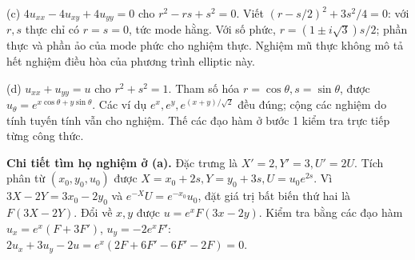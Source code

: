 \documentclass[10pt,a4paper]{article}
\begin{document}
(c) $4u_{xx}-4u_{xy}+4u_{yy}=0$ cho $r^2-rs+s^2=0$. Viết $(r-s/2)^2+3s^2/4=0$: với $r,s$ thực chỉ có $r=s=0$, tức mode hằng. Với số phức, $r=(1\pm i\sqrt3)s/2$; phần thực và phần ảo của mode phức cho nghiệm thực. Nghiệm mũ thực không mô tả hết nghiệm điều hòa của phương trình elliptic này.

(d) $u_{xx}+u_{yy}=u$ cho $r^2+s^2=1$. Tham số hóa $r=\cos\theta,s=\sin\theta$, được $u_\theta=e^{x\cos\theta+y\sin\theta}$. Các ví dụ $e^x,e^y,e^{(x+y)/\sqrt2}$ đều đúng; cộng các nghiệm do tính tuyến tính vẫn cho nghiệm. Thế các đạo hàm ở bước 1 kiểm tra trực tiếp từng công thức.

\textbf{Chi tiết tìm họ nghiệm ở (a).} Đặc trưng là $X'=2,Y'=3,U'=2U$. Tích phân từ $(x_0,y_0,u_0)$ được $X=x_0+2s,Y=y_0+3s,U=u_0e^{2s}$. Vì $3X-2Y=3x_0-2y_0$ và $e^{-X}U=e^{-x_0}u_0$, đặt giá trị bất biến thứ hai là $F(3X-2Y)$. Đổi về $x,y$ được $u=e^xF(3x-2y)$. Kiểm tra bằng các đạo hàm $u_x=e^x(F+3F')$, $u_y=-2e^xF'$: $2u_x+3u_y-2u=e^x(2F+6F'-6F'-2F)=0$.
\end{document}
